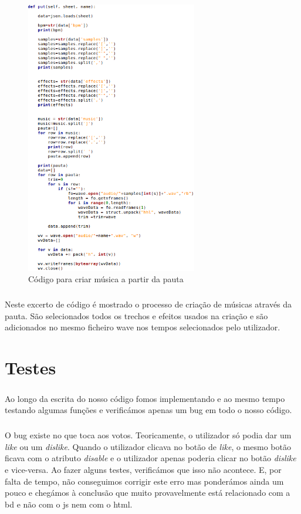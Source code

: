 \documentclass[a4paper]{report}
\begin{document}
\begin{figure}[H]
\center
\includegraphics[height=12cm] {imagens/criar_musica}
\caption{Código para criar música a partir da pauta}
\end{figure}
\paragraph{}Neste excerto de código é mostrado o processo de criação de músicas através da pauta. São selecionados todos os trechos e efeitos usados na criação e são adicionados no mesmo ficheiro \ac{wave} nos tempos selecionados pelo utilizador.

\newpage

\chapter{Testes}
\label{chap.testes}

\paragraph{}Ao longo da escrita do nosso código fomos implementando e ao mesmo tempo testando algumas funções e verificámos apenas um bug em todo o nosso código.

\paragraph{}O bug existe no que toca aos votos. Teoricamente, o utilizador só podia dar um \textit{like} ou um \textit{dislike}. Quando o utilizador clicava no botão de \textit{like}, o mesmo botão ficava com o atributo \textit{disable} e o utilizador apenas poderia clicar no botão \textit{dislike} e vice-versa. Ao fazer alguns testes, verificámos que isso não acontece. E, por falta de tempo, não conseguimos corrigir este erro mas ponderámos ainda um pouco e chegámos à conclusão que muito provavelmente está relacionado com a \ac{bd} e não com o \ac{js} nem com o \ac{html}.
\end{document}

